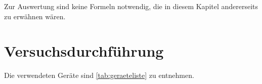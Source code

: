 \documentclass[12pt,english,ngerman]{scrartcl}
\begin{document}
Zur Auswertung sind keine Formeln notwendig, die in diesem Kapitel andererseits zu erwähnen
wären.
\section{Versuchsdurchführung}\label{sec:versuchsdurchfuehrung}
Die verwendeten Geräte sind \autoref{tab:geraeteliste} zu entnehmen.
\end{document}
